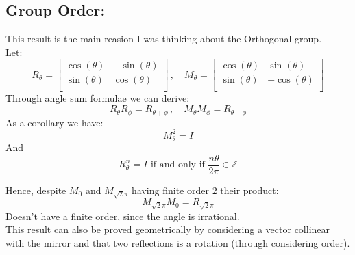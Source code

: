 \begin{center}
\end{center}

\subsection{Group Order:}
This result is the main reasion I was thinking about the Orthogonal group.
\\

Let:
\[
R_\theta=\begin{bmatrix}
	\cos(\theta) & -\sin(\theta) \\
	\sin(\theta) & \cos(\theta) \\
\end{bmatrix}
\, ,\quad
M_\theta=\begin{bmatrix}
	\cos(\theta) & \sin(\theta) \\
	\sin(\theta) & -\cos(\theta) \\
\end{bmatrix}
\]
Through angle sum formulae we can derive:
\[R_\theta R_\phi = R_{\theta+\phi}\,,\quad M_\theta M_\phi = R_{\theta -\phi}\]
As a corollary we have:
\[M_\theta^2 = I\]
And 
\[R_\theta^n = I \text{ if and only if } \frac{n\theta}{2\pi}\in\mathbb{Z}\]

Hence, despite $M_{0}$ and $M_{\sqrt{2}\pi}$ having finite order $2$ their product:
\[M_{\sqrt{2}\pi}M_0 = R_{\sqrt{2}\pi}\]
Doesn't have a finite order, since the angle is irrational.
\\

This result can also be proved geometrically by considering a vector collinear with the mirror and that two reflections is a rotation (through considering order).
